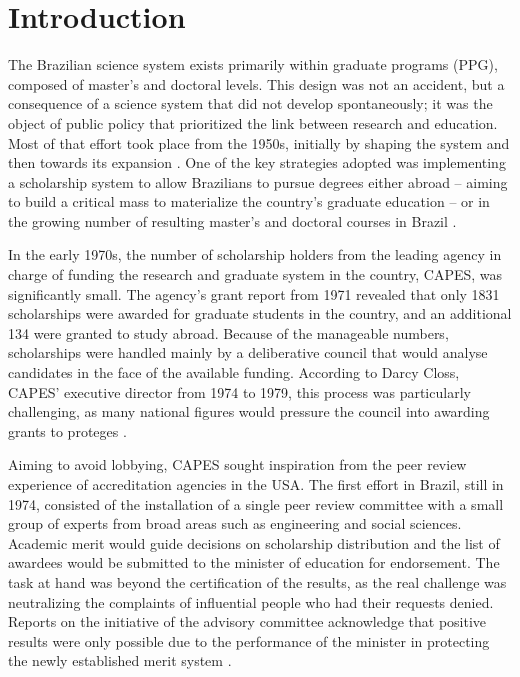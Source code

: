 \section{Introduction}
\label{sec:classif:intro}

The Brazilian science system exists primarily within graduate programs (PPG), composed of master's and doctoral levels. This design was not an accident, but a consequence of a science system that did not develop spontaneously; it was the object of public policy that prioritized the link between research and education. Most of that effort took place from the 1950s, initially by shaping the system and then towards its expansion \autocite{Balbachevsky.2010, Brasil.2020}. One of the key strategies adopted was implementing a scholarship system to allow Brazilians to pursue degrees either abroad – aiming to build a critical mass to materialize the country's graduate education – or in the growing number of resulting master's and doctoral courses in Brazil \autocite{CNPG.1974, Gouvea.2012}.

In the early 1970s, the number of scholarship holders from the leading agency in charge of funding the research and graduate system in the country, CAPES, was significantly small. The agency's grant report from 1971 revealed that only 1831 scholarships were awarded for graduate students in the country, and an additional 134 were granted to study abroad. Because of the manageable numbers, scholarships were handled mainly by a deliberative council that would analyse candidates in the face of the available funding. According to Darcy Closs, CAPES' executive director from 1974 to 1979, this process was particularly challenging, as many national figures would pressure the council into awarding grants to proteges \autocite{Castro.1983, Cordova.2001, Ferreira.2002}. 

Aiming to avoid lobbying, CAPES sought inspiration from the peer review experience of accreditation agencies in the USA. The first effort in Brazil, still in 1974, consisted of the installation of a single peer review committee with a small group of experts from broad areas such as engineering and social sciences. Academic merit would guide decisions on scholarship distribution and the list of awardees would be submitted to the minister of education for endorsement. The task at hand was beyond the certification of the results, as the real challenge was neutralizing the complaints of influential people who had their requests denied. Reports on the initiative of the advisory committee acknowledge that positive results were only possible due to the performance of the minister in protecting the newly established merit system \autocite{Ferreira.2002}.

